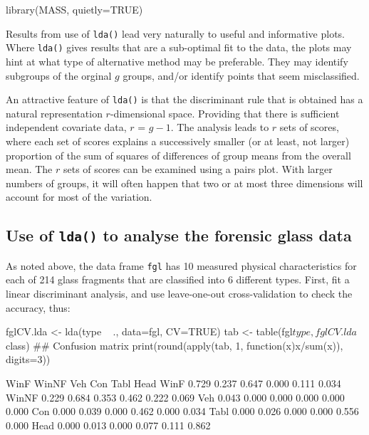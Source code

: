 \documentclass{tufte-book}\usepackage[]{graphicx}\usepackage[]{color}
\newcommand{\txtt}[1]{\texttt{#1}}
\begin{document}
\begin{Schunk}
\begin{Sinput}
library(MASS, quietly=TRUE)
\end{Sinput}
\end{Schunk}

Results from use of \txtt{lda()} lead very
  naturally to useful and informative plots.  Where \txtt{lda()}
  gives results that are a sub-optimal fit to the data,
  the plots may hint at what type of alternative method
  may be preferable.  They may identify subgroups of
  the orginal $g$ groups, and/or identify points that seem
  misclassified.   

An attractive feature of \txtt{lda()} is that the discriminant rule
that is obtained has a natural representation $r$-dimensional space.
Providing that there is sufficient independent covariate data, $r$ =
$g-1$.  The analysis leads  to $r$ sets of scores, where
each set of scores explains a successively smaller (or at least, not
larger) proportion of the sum of squares of differences of group means
from the overall mean.
The $r$ sets of scores can be examined using a
pairs plot.  With larger numbers of groups, it will often happen that
two or at most three dimensions will account for most of the
variation.

\subsection*{Use of \txtt{lda()} to analyse the forensic glass data}

As noted above, the data frame \txtt{fgl} has 10 measured physical
characteristics for each of 214 glass fragments that are classified
into 6 different types.  First, fit a linear discriminant analysis,
and use leave-one-out cross-validation to check the accuracy, thus:
\begin{Schunk}
\begin{Sinput}
fglCV.lda <- lda(type ~ ., data=fgl, CV=TRUE)
tab <- table(fgl$type, fglCV.lda$class)
## Confusion matrix
print(round(apply(tab, 1, function(x)x/sum(x)),
            digits=3))
\end{Sinput}
\begin{Soutput}
       
         WinF WinNF   Veh   Con  Tabl  Head
  WinF  0.729 0.237 0.647 0.000 0.111 0.034
  WinNF 0.229 0.684 0.353 0.462 0.222 0.069
  Veh   0.043 0.000 0.000 0.000 0.000 0.000
  Con   0.000 0.039 0.000 0.462 0.000 0.034
  Tabl  0.000 0.026 0.000 0.000 0.556 0.000
  Head  0.000 0.013 0.000 0.077 0.111 0.862
\end{Soutput}
\end{Schunk}
\end{document}
